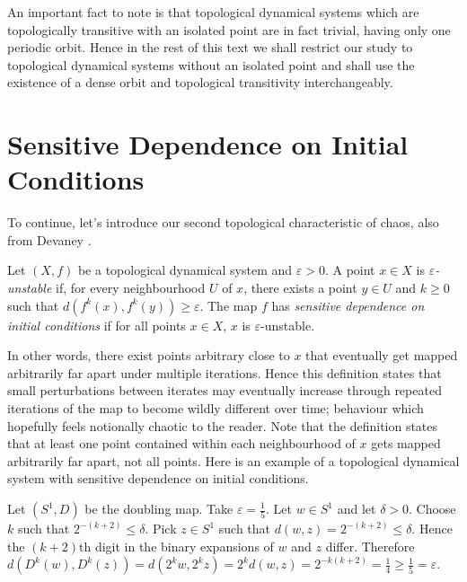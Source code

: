 An important fact to note is that topological dynamical systems which are topologically transitive with an isolated point are in fact trivial, having only one periodic orbit. Hence in the rest of this text we shall restrict our study to topological dynamical systems without an isolated point and shall use the existence of a dense orbit and topological transitivity interchangeably.

\section{Sensitive Dependence on Initial Conditions} \label{sec:sdic}

To continue, let's introduce our second topological characteristic of chaos, also from Devaney \cite{devaney}.

\begin{defn} \label{defn:sensitive-dependence}
    Let $(X, f)$ be a topological dynamical system and $\varepsilon > 0$. A point $x \in X$ is \emph{$\varepsilon$-unstable} if, for every neighbourhood $U$ of $x$, there exists a point $y \in U$ and $k \geq 0$ such that $d\left(f^k(x), f^k(y)\right) \geq \varepsilon$. The map $f$ has \emph{sensitive dependence on initial conditions} if for all points $x \in X$, $x$ is $\varepsilon$-unstable.
\end{defn}

In other words, there exist points arbitrary close to $x$ that eventually get mapped arbitrarily far apart under multiple iterations. Hence this definition states that small perturbations between iterates may eventually increase through repeated iterations of the map to become wildly different over time; behaviour which hopefully feels notionally chaotic to the reader. Note that the definition states that at least one point contained within each neighbourhood of $x$ gets mapped arbitrarily far apart, not all points. Here is an example of a topological dynamical system with sensitive dependence on initial conditions.

\begin{exmp} \label{exmp:doubling-map-s1-sensitive}
    Let $(S^1, D)$ be the doubling map. Take $\varepsilon = \frac{1}{5}$. Let $w \in S^1$ and let $\delta > 0$. Choose $k$ such that $2^{-(k+2)} \leq \delta$. Pick $z \in S^1$ such that $d(w, z) = 2^{-(k+2)} \leq \delta$. Hence the $(k + 2)$th digit in the binary expansions of $w$ and $z$ differ. Therefore $d\left(D^k(w), D^k(z)\right) =  d\left(2^kw, 2^kz\right) = 2^k d(w, z) = 2^{-k(k+2)} = \frac{1}{4} \geq \frac{1}{5} = \varepsilon$.
\end{exmp}

